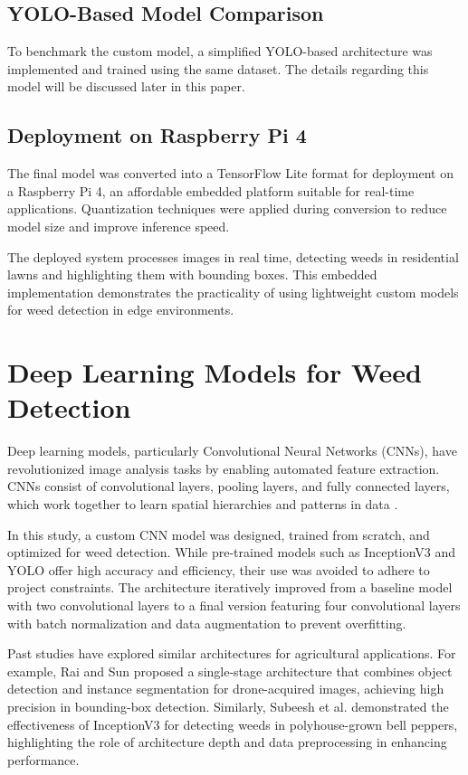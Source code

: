 \documentclass[conference]{IEEEtran}
\begin{document}
\subsection{YOLO-Based Model Comparison}
To benchmark the custom model, a simplified YOLO-based architecture was implemented and trained using the same dataset. The details regarding this model will be discussed later in this paper.

\subsection{Deployment on Raspberry Pi 4}
The final model was converted into a TensorFlow Lite format for deployment on a Raspberry Pi 4, an affordable embedded platform suitable for real-time applications. Quantization techniques were applied during conversion to reduce model size and improve inference speed.

The deployed system processes images in real time, detecting weeds in residential lawns and highlighting them with bounding boxes. This embedded implementation demonstrates the practicality of using lightweight custom models for weed detection in edge environments.



\section{Deep Learning Models for Weed Detection}
Deep learning models, particularly Convolutional Neural Networks (CNNs), have revolutionized image analysis tasks by enabling automated feature extraction. CNNs consist of convolutional layers, pooling layers, and fully connected layers, which work together to learn spatial hierarchies and patterns in data \cite{subeesh2022deep}.

In this study, a custom CNN model was designed, trained from scratch, and optimized for weed detection. While pre-trained models such as InceptionV3 and YOLO offer high accuracy and efficiency, their use was avoided to adhere to project constraints. The architecture iteratively improved from a baseline model with two convolutional layers to a final version featuring four convolutional layers with batch normalization and data augmentation to prevent overfitting.

Past studies have explored similar architectures for agricultural applications. For example, Rai and Sun \cite{rai2024weedvision} proposed a single-stage architecture that combines object detection and instance segmentation for drone-acquired images, achieving high precision in bounding-box detection. Similarly, Subeesh et al. \cite{subeesh2022deep} demonstrated the effectiveness of InceptionV3 for detecting weeds in polyhouse-grown bell peppers, highlighting the role of architecture depth and data preprocessing in enhancing performance.
\end{document}
